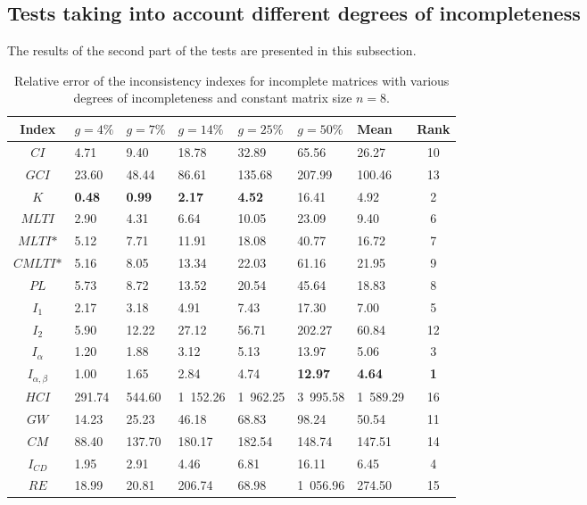 \subsection{Tests taking into account different degrees of incompleteness}
The results of the second part of the tests are presented in this subsection.
\begin{table}[ht]
\begin{center}
\caption{Relative error of the inconsistency indexes for incomplete matrices with various degrees of incompleteness and constant matrix size $n=8$.}
\label{tab:results2}
\begin{tabular}{|c||lllll||l|c|}
\hline Index & $g=4\%$ & $g=7\%$ & $g=14\%$ & $g=25\%$ & $g=50\%$ & Mean & Rank \\ \hline \hline
$\textit{CI}$ & 4.71 & 9.40 & 18.78 & 32.89 & 65.56 & 26.27 & 10 \\ \hline
$\textit{GCI}$ & 23.60 & 48.44 & 86.61 & 135.68 & 207.99 & 100.46  & 13 \\ \hline
$\textit{K}$ & \textbf{0.48} & \textbf{0.99} & \textbf{2.17} & \textbf{4.52} & 16.41 & 4.92 & 2 \\ \hline
$\textit{MLTI}$ & 2.90 & 4.31 & 6.64 & 10.05 & 23.09 & 9.40 & 6 \\ \hline
$\textit{MLTI*}$ & 5.12 & 7.71 & 11.91 & 18.08 & 40.77 & 16.72 & 7 \\ \hline
$\textit{CMLTI*}$ & 5.16 & 8.05 & 13.34 & 22.03 & 61.16 & 21.95 & 9 \\ \hline
$\textit{PL}$ & 5.73 & 8.72 & 13.52 & 20.54 & 45.64 & 18.83 & 8 \\ \hline
$I_1$ & 2.17 & 3.18 & 4.91 & 7.43 & 17.30 & 7.00 & 5 \\ \hline
$I_2$ & 5.90 & 12.22 & 27.12 & 56.71 & 202.27 & 60.84 & 12 \\ \hline
$I_{\alpha}$ & 1.20 & 1.88 & 3.12 & 5.13 & 13.97 & 5.06 & 3 \\ \hline
$I_{\alpha,\beta}$ & 1.00 & 1.65 & 2.84 & 4.74 & \textbf{12.97} & \textbf{4.64} & \textbf{1} \\ \hline
$\textit{HCI}$ & 291.74 & 544.60 & 1 152.26 & 1 962.25 & 3 995.58 & 1 589.29 & 16 \\ \hline
$\textit{GW}$ & 14.23 & 25.23 & 46.18 & 68.83 & 98.24 & 50.54 & 11 \\ \hline
$\textit{CM}$ & 88.40 & 137.70 & 180.17 & 182.54 & 148.74 & 147.51 & 14 \\ \hline
$I_{CD}$ & 1.95 & 2.91 & 4.46 & 6.81 & 16.11 & 6.45 & 4 \\ \hline
$\textit{RE}$ & 18.99 & 20.81 & 206.74 & 68.98 & 1 056.96 & 274.50 & 15 \\ \hline
\end{tabular}
\end{center}
\end{table}

